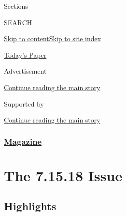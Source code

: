 Sections

SEARCH

\protect\hyperlink{site-content}{Skip to
content}\protect\hyperlink{site-index}{Skip to site index}

\href{https://myaccount.nytimes3xbfgragh.onion/auth/login?response_type=cookie\&client_id=vi}{}

\href{https://www.nytimes3xbfgragh.onion/section/todayspaper}{Today's
Paper}

Advertisement

\protect\hyperlink{after-top}{Continue reading the main story}

Supported by

\protect\hyperlink{after-sponsor}{Continue reading the main story}

\hypertarget{magazine}{%
\subsubsection{\texorpdfstring{\href{/section/magazine}{Magazine}}{Magazine}}\label{magazine}}

\hypertarget{the-71518-issue}{%
\section{The 7.15.18 Issue}\label{the-71518-issue}}

\hypertarget{highlights}{%
\subsection{Highlights}\label{highlights}}

